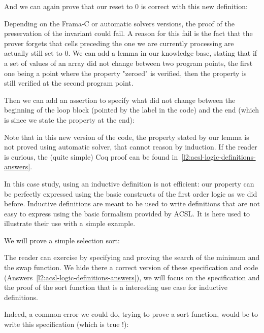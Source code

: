 And we can again prove that our reset to 0 is correct with this new
definition:


Depending on the Frama-C or automatic solvers versions, the proof of the
preservation of the invariant could fail. A reason for this fail is the fact that
the prover forgets that cells preceding the one we are currently processing
are actually still set to 0. We can add a lemma in our knowledge base, stating
that if a set of values of an array did not change between two program points,
the first one being a point where the property "zeroed" is verified, then the
property is still verified at the second program point.




Then we can add an assertion to specify what did not change between the
beginning of the loop block (pointed by the label  in the code)
and the end (which is  since we state the property at the end):




Note that in this new version of the code, the property stated by our lemma is
not proved using automatic solver, that cannot reason by induction. If the
reader is curious, the (quite simple) Coq proof can be found
in~\ref{l2:acsl-logic-definitions-answers}.


In this case study, using an inductive definition is not efficient: our
property can be perfectly expressed using the basic constructs of the first
order logic as we did before. Inductive definitions are meant to be used to
write definitions that are not easy to express using the basic formalism
provided by ACSL. It is here used to illustrate their use with a simple
example.





We will prove a simple selection sort:




The reader can exercise by specifying and proving the search of the minimum and
the swap function. We hide there a correct version of these specification and
code (Answers~\ref{l2:acsl-logic-definitions-answers}), we will focus on the
specification and the proof of the sort function that is a interesting use case
for inductive definitions.

Indeed, a common error we could do, trying to prove a sort function, would
be to write this specification (which is true !):


